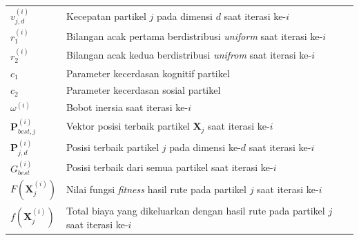 \begin{tabular}{lp{}}
    $v_{j,d}^{(i)}$                 & Kecepatan partikel $j$ pada dimensi $d$ saat iterasi ke-$i$                          \\
    $r_{1}^{(i)}$                   & Bilangan acak pertama berdistribusi \textit{uniform} saat iterasi ke-$i$             \\
    $r_{2}^{(i)}$                   & Bilangan acak kedua berdistribusi \textit{unifrom} saat iterasi ke-$i$               \\
    $c_{1}$                         & Parameter kecerdasan kognitif partikel                                               \\
    $c_{2}$                         & Parameter kecerdasan sosial partikel                                                 \\
    $\omega^{(i)}$                  & Bobot inersia saat iterasi ke-$i$                                                    \\
    $\boldsymbol{P}_{best,j}^{(i)}$ & Vektor posisi terbaik partikel $\boldsymbol{X}_{j}$ saat iterasi ke-$i$              \\
    $\boldsymbol{P}_{j,d}^{(i)}$    & Posisi terbaik partikel $j$ pada dimensi ke-$d$ saat iterasi ke-$i$                  \\
    $G_{best}^{(i)}$                & Posisi terbaik dari semua partikel saat iterasi ke-$i$                               \\
    $F(\boldsymbol{X}_{j}^{(i)})$   & Nilai fungsi \textit{fitness} hasil rute pada partikel $j$ saat iterasi ke-$i$       \\
    $f(\boldsymbol{X}_{j}^{(i)})$   & Total biaya yang dikeluarkan dengan hasil rute pada partikel $j$ saat iterasi ke-$i$ \\
\end{tabular}



